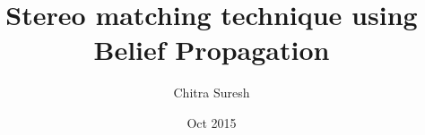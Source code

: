 \clearpage%
\title{ Stereo matching technique using Belief Propagation  }
\author{Chitra Suresh}

\date{Oct 2015}



\maketitle

